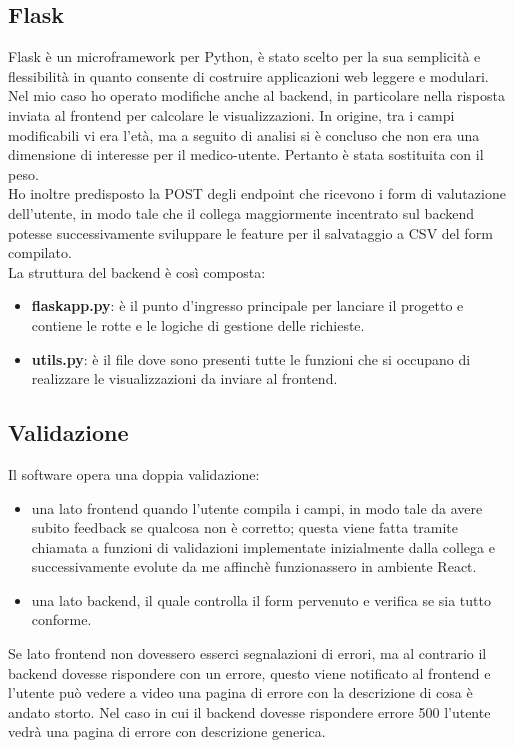 \subsection{Flask}
Flask è un microframework per Python, è stato scelto per la sua semplicità e flessibilità in quanto consente di costruire applicazioni web leggere e modulari.
Nel mio caso ho operato modifiche anche al backend, in particolare nella risposta inviata al frontend per calcolare le visualizzazioni. In origine, tra i campi modificabili vi era l'età, ma a seguito di analisi si è concluso che non era una dimensione di interesse per il medico-utente. Pertanto è stata sostituita con il peso.\\ 
Ho inoltre predisposto la POST degli endpoint che ricevono i form di valutazione dell'utente, in modo tale che il collega maggiormente incentrato sul backend potesse successivamente sviluppare le feature per il salvataggio a CSV del form compilato.\\
La struttura del backend è così composta: 
\begin{itemize}
    \item \textbf{flaskapp.py}: è il punto d'ingresso principale per lanciare il progetto e contiene le rotte e le logiche di gestione delle richieste.
    \item \textbf{utils.py}: è il file dove sono presenti tutte le funzioni che si occupano di realizzare le visualizzazioni da inviare al frontend.
\end{itemize}

\subsection{Validazione}
Il software opera una doppia validazione:
\begin{itemize} 
    \item una lato frontend quando l'utente compila i campi, in modo tale da avere subito feedback se qualcosa non è corretto; questa viene fatta tramite chiamata a funzioni di validazioni implementate inizialmente dalla collega e successivamente evolute da me affinchè funzionassero in ambiente React. 
    \item una lato backend, il quale controlla il form pervenuto e verifica se sia tutto conforme.
\end{itemize}

Se lato frontend non dovessero esserci segnalazioni di errori, ma al contrario il backend dovesse rispondere con un errore, questo viene notificato al frontend e l'utente può vedere a video una pagina di errore con la descrizione di cosa è andato storto. Nel caso in cui il backend dovesse rispondere errore 500 l'utente vedrà una pagina di errore con descrizione generica. 

